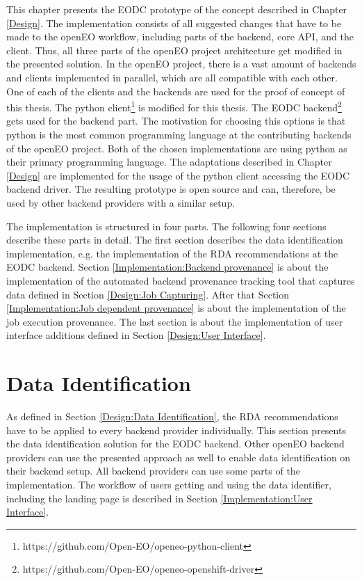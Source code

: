 \documentclass[draft,final]{vutinfth} %
\begin{document}
This chapter presents the EODC prototype of the concept described in Chapter \ref{Design}. The implementation consists of all suggested changes that have to be made to the openEO workflow, including parts of the backend, core API, and the client. Thus, all three parts of the openEO project architecture get modified in the presented solution. In the openEO project, there is a vast amount of backends and clients implemented in parallel, which are all compatible with each other. One of each of the clients and the backends are used for the proof of concept of this thesis. The python client\footnote{https://github.com/Open-EO/openeo-python-client} is modified for this thesis. The EODC backend\footnote{https://github.com/Open-EO/openeo-openshift-driver} gets used for the backend part. The motivation for choosing this options is that python is the most common programming language at the contributing backends of the openEO project. Both of the chosen implementations are using python as their primary programming language. The adaptations described in Chapter \ref{Design} are implemented for the usage of the python client accessing the EODC backend driver. The resulting prototype is open source and can, therefore, be used by other backend providers with a similar setup.  

The implementation is structured in four parts. The following four sections describe these parts in detail. The first section describes the data identification implementation, e.g. the implementation of the RDA recommendations at the EODC backend. Section \ref{Implementation:Backend provenance} is about the implementation of the automated backend provenance tracking tool that captures data defined in Section \ref{Design:Job Capturing}. After that Section \ref{Implementation:Job dependent provenance} is about the implementation of the job execution provenance. The last section is about the implementation of user interface additions defined in Section \ref{Design:User Interface}.     

\section{Data Identification}\label{Implementation:Data Identification}

As defined in Section \ref{Design:Data Identification}, the RDA recommendations have to be applied to every backend provider individually. This section presents the data identification solution for the EODC backend. Other openEO backend providers can use the presented approach as well to enable data identification on their backend setup. All backend providers can use some parts of the implementation. The workflow of users getting and using the data identifier, including the landing page is described in Section \ref{Implementation:User Interface}. \\
\end{document}
